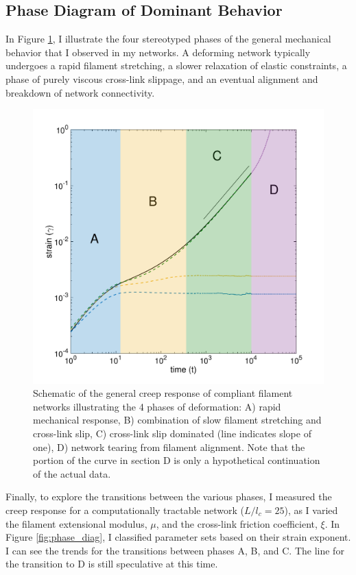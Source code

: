 \subsection{Phase Diagram of Dominant Behavior}
In Figure \ref{fig:shear_modes}, I illustrate the four stereotyped phases of the general mechanical behavior that I observed in my networks.  A deforming network typically undergoes a rapid filament stretching, a slower relaxation of elastic constraints, a phase of purely viscous cross-link slippage, and an eventual alignment and breakdown of network connectivity.

\begin{figure}[h!]
\centering
\includegraphics[width=\hsize]{slippage/shear_modes_b}
\caption[Schematic of the general creep response of compliant filament networks.]{ \label{fig:shear_modes} Schematic of the general creep response of compliant filament networks illustrating the 4 phases of deformation: A) rapid mechanical response, B) combination of slow filament stretching and cross-link slip, C) cross-link slip dominated (line indicates slope of one), D) network tearing from filament alignment. Note that the portion of the curve in section D is only a hypothetical continuation of the actual data.  }
\end{figure}


Finally, to explore the transitions between the various phases, I measured the creep response for a computationally tractable network ($L/l_c = 25$), as I varied the filament extensional modulus, $\mu$, and the cross-link friction coefficient, $\xi$.  In Figure \ref{fig:phase_diag}, I classified parameter sets based on their strain exponent.  I can see the trends for the transitions between phases A, B, and C.  The line for the transition to D is still speculative at this time.  

